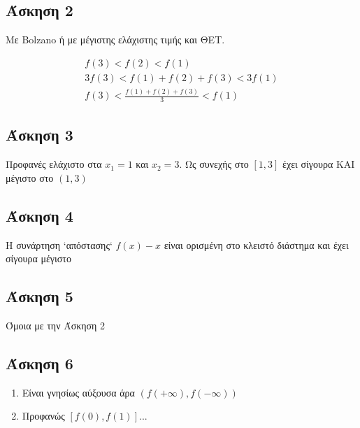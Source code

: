 \documentclass[greek]{beamer}
\begin{document}
\subsection{Άσκηση 2}
\begin{frame}[label=Λύση2]
 Με Bolzano ή με μέγιστης ελάχιστης τιμής και ΘΕΤ.

 \begin{gather*}
  f(3)<f(2)<f(1) \\
  3f(3)<f(1)+f(2)+f(3)<3f(1) \\
  f(3)<\frac{f(1)+f(2)+f(3)}{3}<f(1)
 \end{gather*}

 \hyperlink{Άσκηση2}{}
\end{frame}

\subsection{Άσκηση 3}
\begin{frame}[label=Λύση3]
 Προφανές ελάχιστο στα $x_1=1$ και $x_2=3$. Ως συνεχής στο $[1,3]$ έχει σίγουρα ΚΑΙ μέγιστο στο $(1,3)$

 \hyperlink{Άσκηση3}{}
\end{frame}

\subsection{Άσκηση 4}
\begin{frame}[label=Λύση4]
 Η συνάρτηση `απόστασης` $f(x)-x$ είναι ορισμένη στο κλειστό διάστημα και έχει σίγουρα μέγιστο

 \hyperlink{Άσκηση4}{}
\end{frame}

\subsection{Άσκηση 5}
\begin{frame}[label=Λύση5]
 Όμοια με την Άσκηση 2

 \hyperlink{Άσκηση5}{}
\end{frame}

\subsection{Άσκηση 6}
\begin{frame}[label=Λύση6]
 \begin{enumerate}
  \item Είναι γνησίως αύξουσα άρα $(f(+\infty),f(-\infty))$
  \item Προφανώς $[f(0),f(1)]$...
 \end{enumerate}

 \hyperlink{Άσκηση6}{}
\end{frame}
\end{document}
